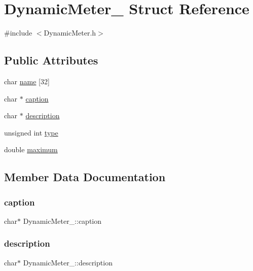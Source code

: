 \hypertarget{structDynamicMeter__}{}\section{Dynamic\+Meter\+\_\+ Struct Reference}
\label{structDynamicMeter__}


{\ttfamily \#include $<$Dynamic\+Meter.\+h$>$}

\subsection*{Public Attributes}
\begin{DoxyCompactItemize}
\item 
char \hyperlink{structDynamicMeter___a53b14f6bfe02476fcb9e93ba0080a72f}{name} \mbox{[}32\mbox{]}
\item 
char $\ast$ \hyperlink{structDynamicMeter___a19b2772b50a861990805e852ab80bb30}{caption}
\item 
char $\ast$ \hyperlink{structDynamicMeter___af049362bf9886b35cbcc2ac79c0f25d8}{description}
\item 
unsigned int \hyperlink{structDynamicMeter___ab37137e8dfb6b9d185102e2bc8fa9182}{type}
\item 
double \hyperlink{structDynamicMeter___a7688befda7e4e4adae67c6fc2e9ae269}{maximum}
\end{DoxyCompactItemize}


\subsection{Member Data Documentation}
\mbox{\label{structDynamicMeter___a19b2772b50a861990805e852ab80bb30}} 
\subsubsection{\texorpdfstring{caption}{caption}}
{\footnotesize\ttfamily char$\ast$ Dynamic\+Meter\+\_\+\+::caption}

\mbox{\label{structDynamicMeter___af049362bf9886b35cbcc2ac79c0f25d8}} 
\subsubsection{\texorpdfstring{description}{description}}
{\footnotesize\ttfamily char$\ast$ Dynamic\+Meter\+\_\+\+::description}

